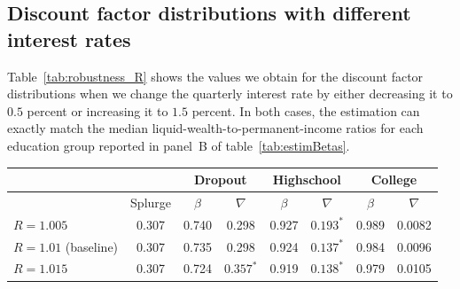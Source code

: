 \documentclass[\latexroot/\projectname]{subfiles}
\begin{document}
\subsection*{Discount factor distributions with different interest rates}
\whenintegrated{\label{sec:robust_R_estim}} %

Table~\ref{tab:robustness_R} shows the values we obtain for the discount factor distributions when we change the quarterly interest rate by either decreasing it to $0.5$ percent or increasing it to $1.5$ percent. In both cases, the estimation can exactly match the median liquid-wealth-to-permanent-income ratios for each education group reported in panel~B of table~\ref{tab:estimBetas}.

\begin{center}
  \begin{tabular}{lc|cccccc}
    \toprule
                          &         & \multicolumn{2}{c}{Dropout} & \multicolumn{2}{c}{Highschool} & \multicolumn{2}{c}{College}                                    \\ \midrule
                          & Splurge & $\beta$                     & $\nabla$                       & $\beta$                     & $\nabla$    & $\beta$ & $\nabla$ \\ \midrule
    $R = 1.005$           & 0.307   & 0.740                       & 0.298                          & 0.927                       & $0.193^{*}$ & 0.989   & 0.0082   \\
    $R = 1.01$ (baseline) & 0.307   & 0.735                       & 0.298                          & 0.924                       & $0.137^{*}$ & 0.984   & 0.0096   \\
    $R = 1.015$           & 0.307   & 0.724                       & $0.357^{*}$                    & 0.919                       & $0.138^{*}$ & 0.979   & 0.0105
    \\ \bottomrule
  \end{tabular}
  \label{tab:robustness_R}
\end{center}
\end{document}
